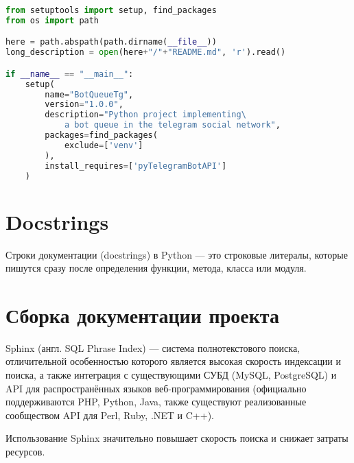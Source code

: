 \begin{lstlisting}[language=Python
	, caption=\leftline{Текст файла setup.py}
	, label=lst:setup]
from setuptools import setup, find_packages
from os import path

here = path.abspath(path.dirname(__file__))
long_description = open(here+"/"+"README.md", 'r').read()

if __name__ == "__main__":
	setup(
		name="BotQueueTg",
		version="1.0.0",
		description="Python project implementing\
			a bot queue in the telegram social network",
		packages=find_packages(
			exclude=['venv']
		),
		install_requires=['pyTelegramBotAPI']
	)
\end{lstlisting}

\section{Docstrings}
Строки документации (docstrings) в Python --- это строковые литералы,
которые пишутся сразу после определения функции, метода, класса или модуля.

\section{Сборка документации проекта}
Sphinx (англ. SQL Phrase Index) --- система полнотекстового поиска,
отличительной особенностью которого является высокая скорость индексации
и поиска, а также интеграция с существующими СУБД (MySQL, PostgreSQL)
и API для распространённых языков веб-программирования
(официально поддерживаются PHP, Python, Java, также существуют реализованные
сообществом API для Perl, Ruby, .NET и C++).\par
Использование Sphinx значительно повышает скорость поиска и снижает
затраты ресурсов.

